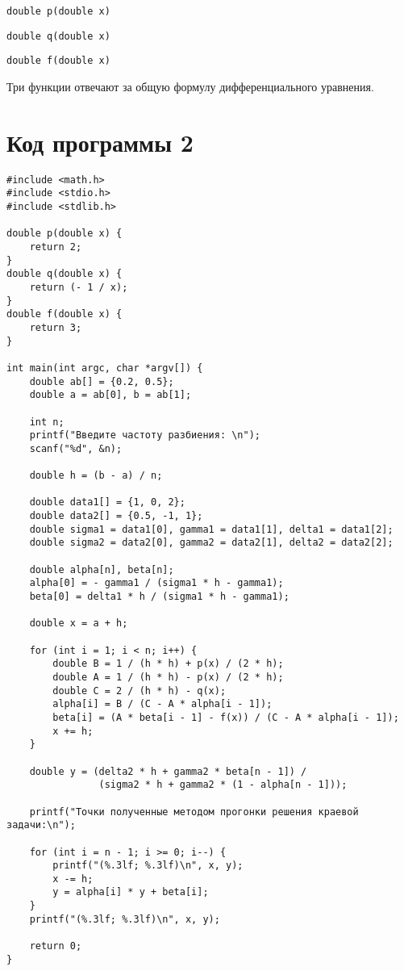 \documentclass[a4paper,12pt,titlepage,finall]{article}
\begin{document}
\begin{verbatim}
double p(double x)
\end{verbatim}

\begin{verbatim}
double q(double x)
\end{verbatim}

\begin{verbatim}
double f(double x)
\end{verbatim}

Три функции отвечают за общую формулу дифференциального уравнения.

\newpage
\section{Код программы 2}
\begin{lstlisting}
#include <math.h>
#include <stdio.h>
#include <stdlib.h>

double p(double x) {
	return 2;
}
double q(double x) {
	return (- 1 / x);
}
double f(double x) {
	return 3;
}

int main(int argc, char *argv[]) {
	double ab[] = {0.2, 0.5};
	double a = ab[0], b = ab[1];

	int n;
	printf("Введите частоту разбиения: \n");
	scanf("%d", &n);
	
	double h = (b - a) / n;
	
	double data1[] = {1, 0, 2};
	double data2[] = {0.5, -1, 1};
	double sigma1 = data1[0], gamma1 = data1[1], delta1 = data1[2];
	double sigma2 = data2[0], gamma2 = data2[1], delta2 = data2[2];

	double alpha[n], beta[n];
	alpha[0] = - gamma1 / (sigma1 * h - gamma1);
	beta[0] = delta1 * h / (sigma1 * h - gamma1);
	
	double x = a + h;
	
	for (int i = 1; i < n; i++) {
		double B = 1 / (h * h) + p(x) / (2 * h);
		double A = 1 / (h * h) - p(x) / (2 * h);
		double C = 2 / (h * h) - q(x);
		alpha[i] = B / (C - A * alpha[i - 1]);
		beta[i] = (A * beta[i - 1] - f(x)) / (C - A * alpha[i - 1]);
		x += h;
	}

	double y = (delta2 * h + gamma2 * beta[n - 1]) / 
				(sigma2 * h + gamma2 * (1 - alpha[n - 1]));
	
	printf("Точки полученные методом прогонки решения краевой задачи:\n");
	
	for (int i = n - 1; i >= 0; i--) {
		printf("(%.3lf; %.3lf)\n", x, y);
		x -= h;
		y = alpha[i] * y + beta[i];
	}
	printf("(%.3lf; %.3lf)\n", x, y);

	return 0;
}

\end{lstlisting}
\end{document}
